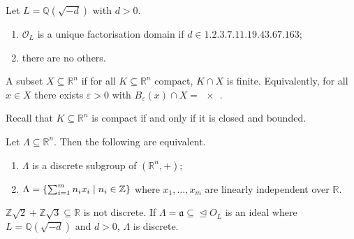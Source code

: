 \begin{theorem}
    Let \( L = \mathbb Q(\sqrt{-d}) \) with \( d > 0 \).
    \begin{enumerate}
        \item \( \mathcal O_L \) is a unique factorisation domain if \( d \in \qty{1, 2, 3, 7, 11, 19, 43, 67, 163} \);
        \item there are no others.
    \end{enumerate}
\end{theorem}
\begin{definition}
    A subset \( X \subseteq \mathbb R^n \) if for all \( K \subseteq \mathbb R^n \) compact, \( K \cap X \) is finite.
    Equivalently, for all \( x \in X \) there exists \( \varepsilon > 0 \) with \( B_\varepsilon(x) \cap X = \qty{x} \).
\end{definition}
Recall that \( K \subseteq \mathbb R^n \) is compact if and only if it is closed and bounded.
\begin{proposition}
    Let \( \Lambda \subseteq \mathbb R^n \).
    Then the following are equivalent.
    \begin{enumerate}
        \item \( \Lambda \) is a discrete subgroup of \( (\mathbb R^n, +) \);
        \item \( \Lambda = \qty{\sum_{i=1}^m n_i x_i \mid n_i \in \mathbb Z} \) where \( x_1, \dots, x_m \) are linearly independent over \( \mathbb R \).
    \end{enumerate}
\end{proposition}
\begin{example}
    \( \mathbb Z\sqrt{2} + \mathbb Z\sqrt{3} \subseteq \mathbb R \) is not discrete.
    If \( \Lambda = \mathfrak a \subseteq \trianglelefteq O_L \) is an ideal where \( L = \mathbb Q(\sqrt{-d}) \) and \( d > 0 \), \( \Lambda \) is discrete.
\end{example}
